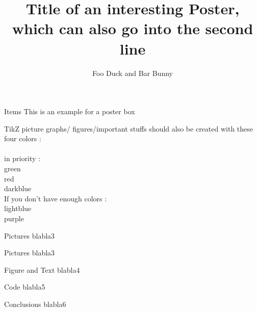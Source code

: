 \documentclass[a0,portrait,final]{a0poster}
\begin{document}
%
  \title{Title of an interesting Poster,\\ which can also go into the second line}
  \author{Foo Duck and Bar Bunny}
  \sffamily

    \begin{poster}
    \makeheader
    \makefooter
    \vspace{18cm}


    \begin{multicols}{2}
    \hspace{2cm}
    \begin{minipage}[r]{\pcolwidth}

\begin{posterbox}{20cm}{Items}
    This is an example for a poster box

    \end{posterbox}
        
    \begin{posterbox}{20cm}{TikZ picture}
     graphs/ figures/important stuffs should also be created with these four colors : \\ \\
in priority : \\
{\Large \color{green} green}\\
{\Large \color{red} red}\\
{\Large \color{darkblue} darkblue}\\

If you don't have enough colors :\\
{\Large \color{lightblue} lightblue}\\
{\Large \color{purple} purple}

     
      \end{posterbox}
      
      \begin{posterbox}{20cm}{Pictures}
      blabla3
      \end{posterbox}

      \begin{posterbox}{10cm}{Pictures}
      blabla3
      \end{posterbox}
   \end{minipage}


    \begin{minipage}{\pcolwidth}
    \begin{posterbox}{30cm}{Figure and Text}
    blabla4
    \end{posterbox}
    
    \begin{posterbox}{27cm}{Code}
  blabla5
    \end{posterbox} 
    
     \boxwidth=10cm
   \begin{posterbox}{20cm}{Conclusions}
  blabla6
    \end{posterbox}
    \end{minipage}
    \end{multicols}
  \end{poster}
\end{document}
